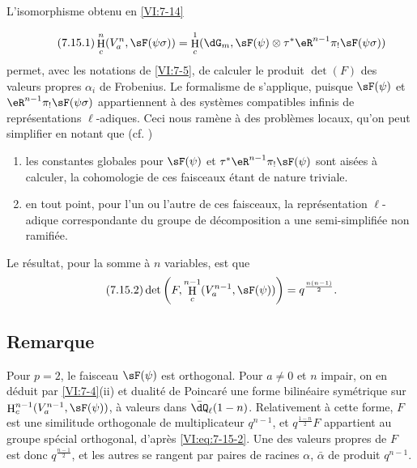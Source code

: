 \documentclass[oneside]{book}
\DeclareMathOperator{\h}{H}
\theoremstyle{sga-source}
\theoremstyle{sga-source-dash}
\theoremstyle{sga-source-dotdash}
\theoremstyle{sga-source-number-note-dash}
\theoremstyle{sga-source-note-number-dotdash}
\theoremstyle{sga-source-example-dotdash}
\theoremstyle{sga-source-inline-number}
\theoremstyle{sga-source-bare-number}
\theoremstyle{sga-source}
\newcommand{\PrintPage}[1]{}\newcommand{\MathPage}[1]{}\newcommand{\PrintCite}[2]{#1}\newcommand{\var}[3]{#2}
\begin{document}
L'isomorphisme obtenu en \ref{VI:7-14} 
\PrintPage{226}
\begin{equation*}\tag{7.15.1}\label{VI:eq:7-15-1}
  \h_c^n(V_a^n,\sF(\psi\sigma)) = \h_c^1(\dG_m,\sF(\psi)\otimes \tau^\ast \eR^{n-1} \pi_! \sF(\psi\sigma)) 
\end{equation*}
permet, avec les notations de \ref{VI:7-5}, de calculer le produit $\det(F)$ 
des valeurs propres $\alpha_i$ de Frobenius. Le formalisme de \cite{de73} 
s'applique, puisque $\sF(\psi)$ et $\eR^{n-1} \pi_! \sF(\psi\sigma)$ 
appartiennent à des systèmes compatibles infinis de représentations 
$\ell$-adiques. Ceci nous ramène à des problèmes locaux, qu'on peut 
simplifier en notant que (cf. \cite[9.5]{de73}) 
\begin{enumerate}[\indent a)]
  \item les constantes globales pour 
    $\sF(\psi)$ et $\tau^\ast \eR^{n-1} \pi_! \sF(\psi)$ sont aisées à 
    calculer, la cohomologie de ces faisceaux étant de nature triviale. 
  \item en tout point, pour l'un ou l'autre de ces faisceaux, la 
    représentation $\ell$-adique correspondante du groupe de décomposition 
    a une semi-simplifiée non ramifiée. 
\end{enumerate}

Le résultat, pour la somme à $n$ variables, est que 
\begin{equation*}\tag{7.15.2}\label{VI:eq:7-15-2}
  \det\left(F,\h_c^{n-1}(V_a^{n-1},\sF(\psi))\right) = q^{\frac{n(n-1)}{2}} \text{.} 
\end{equation*}





\subsection{Remarque}\label{VI:7-16}

Pour $p=2$, le faisceau $\sF(\psi)$ est orthogonal. Pour $a\ne 0$ et $n$ 
impair, on en déduit par \ref{VI:7-4}(ii) et dualité de Poincaré une 
forme bilinéaire symétrique sur $\h_c^{n-1}(V_a^{n-1},\sF(\psi))$, à 
valeurs dans $\bar\dQ_\ell(1-n)$. Relativement à cette forme, $F$ est une 
similitude orthogonale de multiplicateur $q^{n-1}$, et $q^{\frac{1-n}{2}} F$ 
appartient au groupe spécial orthogonal, d'après \eqref{VI:eq:7-15-2}. Une 
des \var{valeurs propres de $F$ est donc $q^{\frac{1-n}{2}}$}{valeurs propres de $F$ est donc $q^{\frac{n-1}{2}}$}{S45-SOL-0951}, et les autres se 
rangent par paires de racines $\alpha$, $\bar\alpha$ de produit $q^{n-1}$. 
\end{document}
